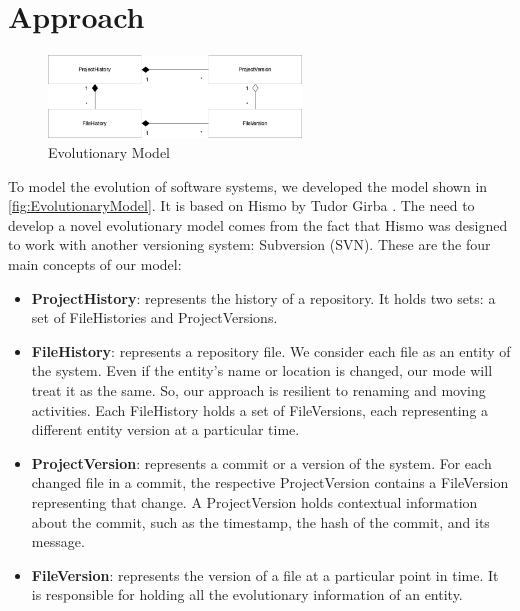 \documentclass[11pt,twoside,english,singlespacing,headsepline,consistentlayout]{auxiliary/si-msc-thesis}
\begin{document}
\section*{Approach}
\begin{figure}[ht]
    \begin{center}
        \includegraphics[width=0.6\textwidth]{images/approach/EvolutionModel.jpg}
    \end{center}
    \caption{Evolutionary Model}
    \label{fig:EvolutionaryModel}
\end{figure}


To model the evolution of software systems, we developed the model 
shown in \autoref{fig:EvolutionaryModel}. It is based on Hismo by Tudor Girba \cite{Girba2005}.
The need to develop a novel evolutionary model comes from the fact that Hismo was designed to work with another versioning system: Subversion (SVN). 
These are the four main concepts of our model: 
\begin{itemize}
    \item \textbf{ProjectHistory}: represents the history of a repository. It holds two sets: a set of FileHistories and ProjectVersions. 
    \item \textbf{FileHistory}: represents a repository file. We consider each file as an entity of the system. Even if the entity's name or location is changed, our mode will treat it as the same. So, our approach is resilient to renaming and moving activities. Each FileHistory holds a set of FileVersions, each representing a different entity version at a particular time.  
    \item \textbf{ProjectVersion}: represents a commit or a version of the system. 
    For each changed file in a commit, the respective ProjectVersion contains a FileVersion representing that change.
    A ProjectVersion holds contextual information about the commit, such as the timestamp, the hash of the commit, and its message.
    \item \textbf{FileVersion}: represents the version of a file at a particular point in time.
    It is responsible for holding all the evolutionary information of an entity. 
\end{itemize}
\end{document}
